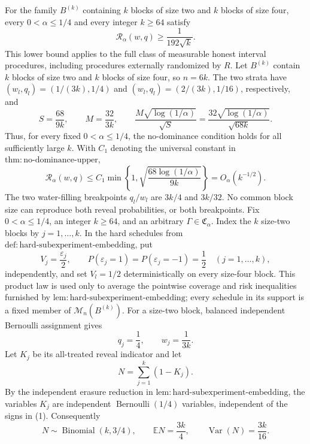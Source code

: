 For the family \(B^{(k)}\) containing \(k\) blocks of size two and \(k\) blocks of size four, every \(0<\alpha\le 1/4\) and every integer \(k\ge64\) satisfy
\[
 \mathcal R_\alpha(w,q)\ge \frac{1}{192\sqrt{k}}.
\]
This lower bound applies to the full class of measurable honest interval procedures, including procedures externally randomized by \(R\).
Let \(B^{(k)}\) contain \(k\) blocks of size two and \(k\) blocks of
size four, so \(n=6k\).  The two strata have
\((w_l,q_l)=(1/(3k),1/4)\) and
\((w_l,q_l)=(2/(3k),1/16)\), respectively, and
\[
 S=\frac{68}{9k},\qquad M=\frac{32}{3k},\qquad
 \frac{M\sqrt{\log(1/\alpha)}}{\sqrt S}
 =\frac{32\sqrt{\log(1/\alpha)}}{\sqrt{68k}}.
\]
Thus, for every fixed \(0<\alpha\le1/4\), the no-dominance condition
holds for all sufficiently large \(k\).  With \(C_1\) denoting the
universal constant in
\(\mathrm{thm{:}no\text{-}dominance\text{-}upper}\),
\[
 \mathcal R_\alpha(w,q)
 \le C_1\min\left\{1,
       \sqrt{\frac{68\log(1/\alpha)}{9k}}\right\}
 =O_\alpha(k^{-1/2}).
\]
The two water-filling breakpoints \(q_l/w_l\) are \(3k/4\) and
\(3k/32\).  No common block size can reproduce both reveal
probabilities, or both breakpoints.
Fix \(0<\alpha\le1/4\), an integer \(k\ge64\), and an arbitrary
\(\Gamma\in\mathfrak C_\alpha\).  Index the \(k\) size-two blocks by
\(j=1,\ldots,k\).  In the hard schedules from
\(\mathrm{def{:}hard\text{-}subexperiment\text{-}embedding}\), put
\[
 V_j=\frac{\varepsilon_j}{2},\qquad
 P(\varepsilon_j=1)=P(\varepsilon_j=-1)=\frac12
 \quad(j=1,\ldots,k),
\tag{1}
\]
independently, and set \(V_l=1/2\) deterministically on every size-four
block.  This product law is used only to average the pointwise coverage
and risk inequalities furnished by
\(\mathrm{lem{:}hard\text{-}subexperiment\text{-}embedding}\); every
schedule in its support is a fixed member of \(\mathcal M_n(B^{(k)})\).
For a size-two block, balanced independent Bernoulli assignment gives
\[
 q_j=\frac14,\qquad w_j=\frac1{3k}.
\tag{2}
\]
Let \(K_j\) be its all-treated reveal indicator and let
\[
 N=\sum_{j=1}^k(1-K_j).
\tag{3}
\]
By the independent erasure reduction in
\(\mathrm{lem{:}hard\text{-}subexperiment\text{-}embedding}\), the
variables \(K_j\) are independent \(\operatorname{Bernoulli}(1/4)\)
variables, independent of the signs in (1).  Consequently
\[
 N\sim\operatorname{Binomial}(k,3/4),\qquad
 \mathbb EN=\frac{3k}{4},\qquad
 \operatorname{Var}(N)=\frac{3k}{16}.
\tag{4}
\]


